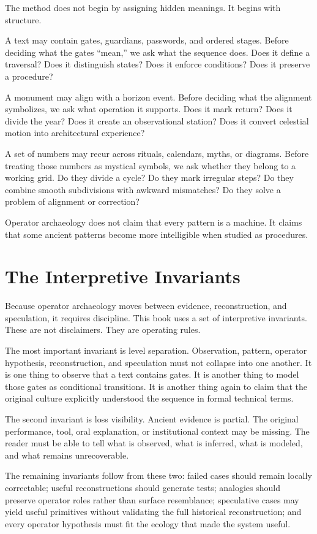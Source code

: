 \documentclass[11pt]{book}
\begin{document}
The method does not begin by assigning hidden meanings. It begins with structure.

A text may contain gates, guardians, passwords, and ordered stages. Before deciding what the gates ``mean,'' we ask what the sequence does. Does it define a traversal? Does it distinguish states? Does it enforce conditions? Does it preserve a procedure?

A monument may align with a horizon event. Before deciding what the alignment symbolizes, we ask what operation it supports. Does it mark return? Does it divide the year? Does it create an observational station? Does it convert celestial motion into architectural experience?

A set of numbers may recur across rituals, calendars, myths, or diagrams. Before treating those numbers as mystical symbols, we ask whether they belong to a working grid. Do they divide a cycle? Do they mark irregular steps? Do they combine smooth subdivisions with awkward mismatches? Do they solve a problem of alignment or correction?

Operator archaeology does not claim that every pattern is a machine. It claims that some ancient patterns become more intelligible when studied as procedures.

\section{The Interpretive Invariants}

Because operator archaeology moves between evidence, reconstruction, and speculation, it requires discipline. This book uses a set of interpretive invariants. These are not disclaimers. They are operating rules.

The most important invariant is level separation. Observation, pattern, operator hypothesis, reconstruction, and speculation must not collapse into one another. It is one thing to observe that a text contains gates. It is another thing to model those gates as conditional transitions. It is another thing again to claim that the original culture explicitly understood the sequence in formal technical terms.

The second invariant is loss visibility. Ancient evidence is partial. The original performance, tool, oral explanation, or institutional context may be missing. The reader must be able to tell what is observed, what is inferred, what is modeled, and what remains unrecoverable.

The remaining invariants follow from these two: failed cases should remain locally correctable; useful reconstructions should generate tests; analogies should preserve operator roles rather than surface resemblance; speculative cases may yield useful primitives without validating the full historical reconstruction; and every operator hypothesis must fit the ecology that made the system useful.
\end{document}
